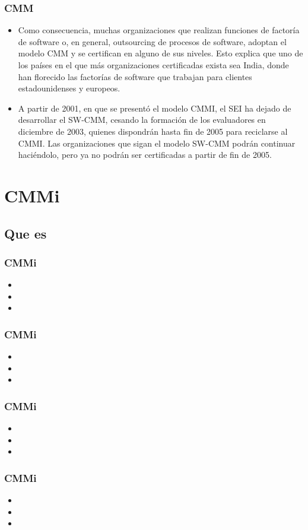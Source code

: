 \documentclass{beamer}
\begin{document}
\frame
{
  \frametitle{CMM}
  \begin{itemize}
    \item<1-> Como consecuencia, muchas organizaciones que realizan funciones de factoría de software o, en general, outsourcing de procesos de software, adoptan el modelo CMM y se certifican en alguno de sus niveles. Esto explica que uno de los países en el que más organizaciones certificadas exista sea India, donde han florecido las factorías de software que trabajan para clientes estadounidenses y europeos.

    \item<2-> A partir de 2001, en que se presentó el modelo CMMI, el SEI ha dejado de desarrollar el SW-CMM, cesando la formación de los evaluadores en diciembre de 2003, quienes dispondrán hasta fin de 2005 para reciclarse al CMMI. Las organizaciones que sigan el modelo SW-CMM podrán continuar haciéndolo, pero ya no podrán ser certificadas a partir de fin de 2005.
  \end{itemize}
}

\section{CMMi}
\subsection{Que es}
\frame
{
  \frametitle{CMMi}
  	\begin{itemize}
  	\item<1->
  	\item<2->
  	\item<3->
  	\end{itemize}
}

\frame
{
  \frametitle{CMMi}
  	\begin{itemize}
  	\item<1->
  	\item<2->
  	\item<3->
  	\end{itemize}
}

\frame
{
  \frametitle{CMMi}
  	\begin{itemize}
  	\item<1->
  	\item<2->
  	\item<3->
  	\end{itemize}
}

\frame
{
  \frametitle{CMMi}
  	\begin{itemize}
  	\item<1->
  	\item<2->
  	\item<3->
  	\end{itemize}
}
\end{document}
